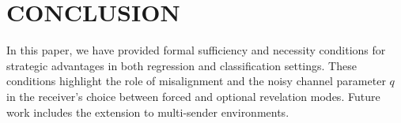 \section{CONCLUSION}
In this paper, we have provided formal sufficiency and necessity conditions for strategic advantages in both regression and classification settings. These conditions highlight the role of misalignment and the noisy channel parameter $q$ in the receiver's choice between forced and optional revelation modes. Future work includes the extension to multi-sender environments.

